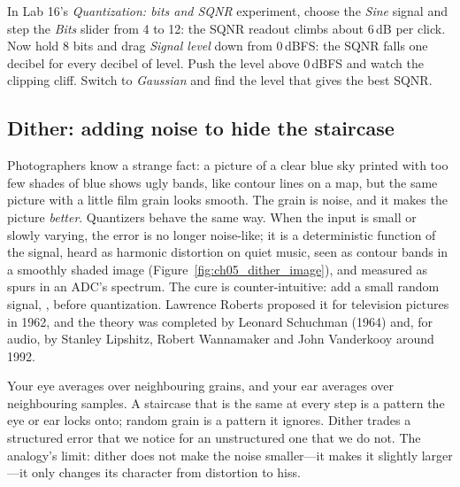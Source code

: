 
\begin{tryit}
In Lab 16's \emph{Quantization: bits and SQNR} experiment, choose the \emph{Sine} signal and
step the \emph{Bits} slider from 4 to 12: the SQNR readout climbs about 6\,dB per click. Now hold
8 bits and drag \emph{Signal level} down from 0\,dBFS: the SQNR falls one decibel for every
decibel of level. Push the level above 0\,dBFS and watch the clipping cliff. Switch to
\emph{Gaussian} and find the level that gives the best SQNR.
\end{tryit}

\subsection{Dither: adding noise to hide the staircase}
\label{sec:ch05:dither}

Photographers know a strange fact: a picture of a clear blue sky printed with too few shades of
blue shows ugly bands, like contour lines on a map, but the same picture with a little film grain
looks smooth. The grain is noise, and it makes the picture \emph{better}. Quantizers behave the same
way. When the input is small or slowly varying, the error is no longer noise-like; it is a
deterministic function of the signal, heard as harmonic distortion on quiet music, seen as
contour bands in a smoothly shaded image (Figure~\ref{fig:ch05_dither_image}), and measured as spurs
in an ADC's spectrum. The cure is counter-intuitive: add a small random signal, ,
before quantization. Lawrence Roberts proposed it for television pictures in 1962, and the theory
was completed by Leonard Schuchman (1964) and, for audio, by Stanley Lipshitz, Robert Wannamaker
and John Vanderkooy around 1992.


\begin{analogy}
Your eye averages over neighbouring grains, and your ear averages over neighbouring samples. A
staircase that is the same at every step is a pattern the eye or ear locks onto; random grain is
a pattern it ignores. Dither trades a structured error that we notice for an unstructured one that
we do not. The analogy's limit: dither does not make the noise smaller---it makes it slightly
larger---it only changes its character from distortion to hiss.
\end{analogy}


